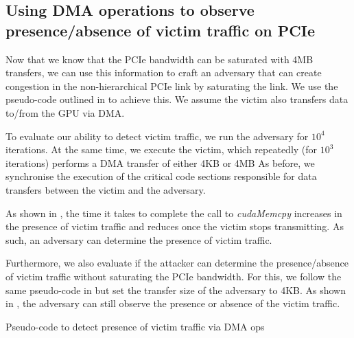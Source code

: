 \subsection{Using DMA operations to observe presence/absence of victim traffic on PCIe}
\label{subsec:interconnect-sc-dma-evaluation}

Now that we know that the PCIe bandwidth can be saturated with 4MB transfers, we can use this information to craft an adversary that can create congestion in the non-hierarchical PCIe link by saturating the link.
We use the pseudo-code outlined in  to achieve this.
We assume the victim also transfers data to/from the GPU via DMA.

To evaluate our ability to detect victim traffic, we run the adversary for $10^4$ iterations.
At the same time, we execute the victim, which repeatedly (for $10^3$ iterations) performs a DMA transfer of either 4KB or 4MB
As before, we synchronise the execution of the critical code sections responsible for data transfers between the victim and the adversary. 

As shown in , the time it takes to complete the call to \textit{cudaMemcpy} increases in the presence of victim traffic and reduces once the victim stops transmitting.
As such, an adversary can determine the presence of victim traffic.

Furthermore, we also evaluate if the attacker can determine the presence/absence of victim traffic without saturating the PCIe bandwidth.
For this, we follow the same pseudo-code in  but set the transfer size of the adversary to 4KB.
As shown in , the adversary can still observe the presence or absence of the victim traffic.


\begin{minipage}{\textwidth}
    
    \captionsetup{type=lstlisting}
    \caption{Pseudo-code to detect presence of victim traffic via DMA ops}
    \label{lst:timing-victim-with-dma}
\end{minipage}


